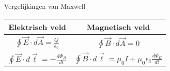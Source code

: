

\begin{summ}{Vergelijkingen van Maxwell}
    \vspace{-0.3cm}
    \begin{center}
        \def\arraystretch{2}
        \begin{tabular}{c|c}
            Elektrisch veld & Magnetisch veld \\ \hline
            $\oint \Vec{E} \cdot d\Vec{A} = \frac{Q}{\epsilon_0}$ 
                &  $\oint \Vec{B} \cdot d\Vec{A} = 0$ \\
            $\oint \Vec{E} \cdot d\Vec{\ell} = -\frac{d\Phi_B}{dt}$ 
                &  $\oint \Vec{B} \cdot d\Vec{\ell} = \mu_0I + \mu_0 \epsilon_0 \frac{d\Phi_B}{dt}$ \\
        \end{tabular}
    \end{center}
\end{summ}

